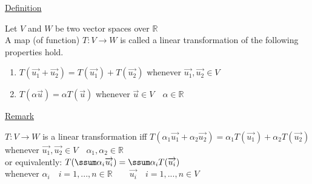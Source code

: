 \documentclass[12pt]{article}
\renewcommand{\v}[1]{\overrightarrow{#1}}
\newcommand{\real}[0]{\mathbb{R}}
\newenvironment{block}[1][Label]{\underline{#1}\par}{}
\begin{document}
\begin{block}[Definition]
	Let $V$ and $W$ be two vector spaces over $\real$ \\
	A map (of function) $T: V \rightarrow W$ is called a linear transformation of the following properties hold.
	
	\begin{enumerate}
		\item $T(\v{u_1} + \v{u_2}) = T(\v{u_1}) + T(\v{u_2})$ whenever $\v{u_1}, \v{u_2} \in V$
		
		\item $T(\alpha \v{u}) = \alpha T(\v{u})$ whenever $\v{u} \in V \quad \alpha \in \real$
	\end{enumerate}

\end{block}

\begin{block}[Remark]
	$T : V  \rightarrow W$ is a linear transformation iff $T(\alpha_1 \v{u_1} + \alpha_2 \v{u_2}) = \alpha_1 T(\v{u_1}) + \alpha_2 T(\v{u_2})$ whenever $\v{u_1}, \v{u_2} \in V \quad \alpha_1, \alpha_2 \in \real$ \\
	or equivalently: $T(\ssum \alpha_i \v{u_i}) = \ssum \alpha_i T(\v{u_i})$ \\
	whenever $\alpha_i \quad i = 1, ..., n \in \real \qquad \v{u_i} \quad i = 1, ..., n \in V$
\end{block}
\end{document}
